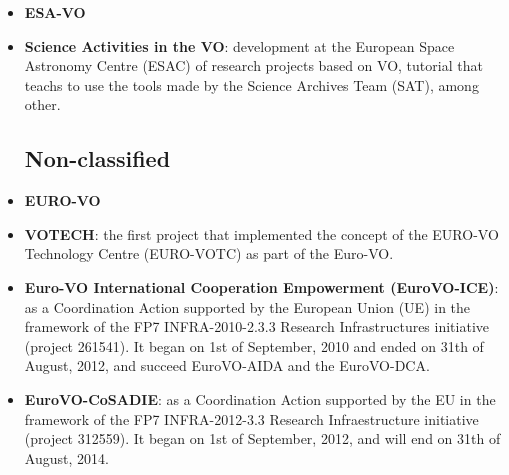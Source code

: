 \begin{itemize}
\item \textbf{ESA-VO}
\item \textbf{Science Activities in the VO}:
development at the European Space Astronomy Centre (ESAC) of research projects
based on VO, tutorial that teachs to use the tools made by the Science Archives
Team (SAT), among other.

\subsection{Non-classified}
\item \textbf{EURO-VO}
\item \textbf{VOTECH}:
the first project that implemented the concept of the EURO-VO Technology Centre
(EURO-VOTC) as part of the Euro-VO.

\item \textbf{Euro-VO International Cooperation Empowerment (EuroVO-ICE)}:
as a Coordination Action supported by the European Union (UE) in the framework
of the FP7 INFRA-2010-2.3.3 Research Infrastructures initiative (project
261541). It began on 1st of September, 2010 and ended on 31th of August, 2012,
and succeed EuroVO-AIDA and the EuroVO-DCA.

\item \textbf{EuroVO-CoSADIE}:
as a Coordination Action supported by the EU in the framework of the FP7
INFRA-2012-3.3 Research Infraestructure initiative (project 312559). It began on
1st of September, 2012, and will end on 31th of August, 2014.

\end{itemize}